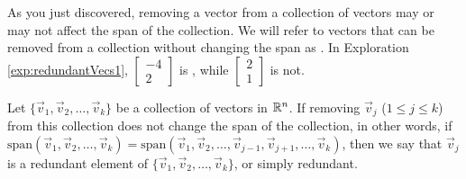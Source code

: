 \documentclass{ximera}
\begin{document}
As you just discovered, removing a vector from a collection of vectors may or may not affect the span of the collection.  We will refer to vectors that can be removed from a collection without changing the span as .  In Exploration \ref{exp:redundantVecs1}, $\begin{bmatrix}-4\\2\end{bmatrix}$ is , while $\begin{bmatrix}2\\1\end{bmatrix}$ is not.

\begin{definition}\label{def:redundant}
Let $\{\vec{v}_1,\vec{v}_2,\dots,\vec{v}_k\}$ be a collection of vectors in $\mathbb{R}^n$.  If removing $\vec{v}_j$ ($1\leq j\leq k$) from this collection does not change the span of the collection, in other words, if $\mbox{span}\left(\vec{v}_1,\vec{v}_2,\dots,\vec{v}_k\right)=\mbox{span}\left(\vec{v}_1,\vec{v}_2,\dots,\vec{v}_{j-1},\vec{v}_{j+1},\dots,\vec{v}_k\right)$, then we say that $\vec{v}_j$ is a redundant element of $\{\vec{v}_1,\vec{v}_2,\dots,\vec{v}_k\}$, or simply redundant.
\end{definition}
\end{document}
